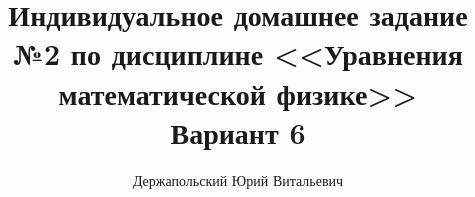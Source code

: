 \documentclass[14pt, a4paper, titlepage, fleqn]{extarticle}
\title{Индивидуальное домашнее задание №2 по дисциплине <<Уравнения математической физике>>\\Вариант 6}
\author{Держапольский Юрий Витальевич}
\date{}
\begin{document}
    \maketitle

    

    \pagebreak
    
    

    \pagebreak
    
    
    
\end{document}
